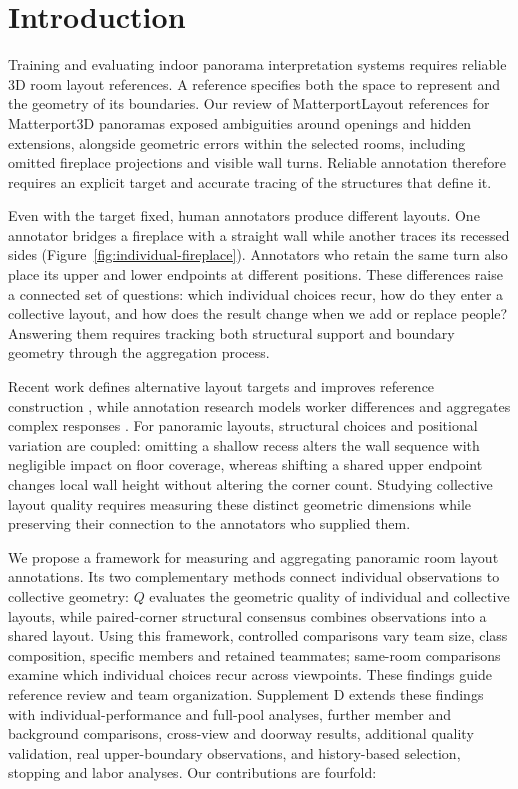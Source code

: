 \section{Introduction}

Training and evaluating indoor panorama interpretation systems requires reliable 3D room layout references. A reference specifies both the space to represent and the geometry of its boundaries. Our review of MatterportLayout references for Matterport3D panoramas \cite{chang2017matterport3d,zou2021manhattan} exposed ambiguities around openings and hidden extensions, alongside geometric errors within the selected rooms, including omitted fireplace projections and visible wall turns. Reliable annotation therefore requires an explicit target and accurate tracing of the structures that define it.

Even with the target fixed, human annotators produce different layouts. One annotator bridges a fireplace with a straight wall while another traces its recessed sides (Figure~\ref{fig:individual-fireplace}). Annotators who retain the same turn also place its upper and lower endpoints at different positions. These differences raise a connected set of questions: which individual choices recur, how do they enter a collective layout, and how does the result change when we add or replace people? Answering them requires tracking both structural support and boundary geometry through the aggregation process.



Recent work defines alternative layout targets and improves reference construction \cite{c2ref06,dong2024panocontext,kanayama2025tof360}, while annotation research models worker differences and aggregates complex responses \cite{c2ref07,c2ref17}. For panoramic layouts, structural choices and positional variation are coupled: omitting a shallow recess alters the wall sequence with negligible impact on floor coverage, whereas shifting a shared upper endpoint changes local wall height without altering the corner count. Studying collective layout quality requires measuring these distinct geometric dimensions while preserving their connection to the annotators who supplied them.

We propose a framework for measuring and aggregating panoramic room layout annotations. Its two complementary methods connect individual observations to collective geometry: $Q$ evaluates the geometric quality of individual and collective layouts, while paired-corner structural consensus combines observations into a shared layout. Using this framework, controlled comparisons vary team size, class composition, specific members and retained teammates; same-room comparisons examine which individual choices recur across viewpoints. These findings guide reference review and team organization. Supplement D extends these findings with individual-performance and full-pool analyses, further member and background comparisons, cross-view and doorway results, additional quality validation, real upper-boundary observations, and history-based selection, stopping and labor analyses. Our contributions are fourfold:


